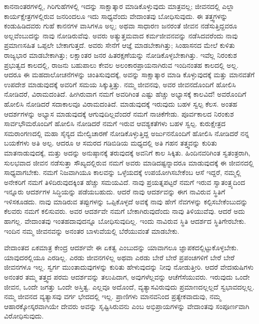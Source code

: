 ಕಾನನಾಂತರಗಳಲ್ಲಿ, ಗಿರಿಗುಹೆಗಳಲ್ಲಿ ಇದನ್ನು ಸಾಕ್ಷಾತ್ಕಾರ ಮಾಡಿಕೊಳ್ಳುವುದು ಮಾತ್ರವಲ್ಲ; ಜೀವನದಲ್ಲಿ ಎಲ್ಲಾ ಕಾರ್ಯಕ್ಷೇತ್ರಗಳಲ್ಲಿರುವ ಜನರಿಂದಲೂ ಇದು ಸಾಧ್ಯವೆಂದು ವೇದಾಂತವು ಬೋಧಿಸುವುದು. ಈ ತತ್ತ್ವಗಳನ್ನು ಕಂಡುಹಿಡಿದವರು ಗುಹೆ ಕಾನನಗಳ ವಾಸಿಗಳೂ ಅಲ್ಲ; ಅಥವಾ ಸಾಧಾರಣ ಜನರಂತೆ ಜೀವನ ನಡೆಸುತ್ತಿದ್ದವರೂ ಅಲ್ಲವೆಂಬುದನ್ನು ನಾವು ನೋಡಿರುವೆವು. ಅವರು ಅತ್ಯುತ್ತಮವಾದ ಕರ್ಮಜೀವನವನ್ನು ನಡೆಸಿದವರೆಂದು ನಾವು ಪ್ರಮಾಣಸಹಿತ ಒಪ್ಪಲೇ ಬೇಕಾಗುತ್ತದೆ. ಅವರು ಸೇನೆಗೆ ಆಜ್ಞೆ ಮಾಡಬೇಕಾಗಿತ್ತು; ಸಿಂಹಾಸನದ ಮೇಲೆ ಕುಳಿತು ರಾಜ್ಯಭಾರ ಮಾಡಬೇಕಾಗಿತ್ತು; ಲಕ್ಷಾಂತರ ಜನರ ಹಿತರಕ್ಷಣೆಯನ್ನು ನೋಡಿಕೊಳ್ಳಬೇಕಾಗಿತ್ತು. ಇವೆಲ್ಲ ನಿರಂಕುಶ ಪ್ರಭುತ್ವದ ಕಾಲದಲ್ಲಿ, ರಾಜನು ಬಹುಪಾಲು ಕೇವಲ ಅಲಂಕಾರಪ್ರಾಯನಾಗಿರುವ ಇಂದಿನಂತಹ ಕಾಲದಲ್ಲಿ ಅಲ್ಲ. ಆದರೂ ಈ ಮಹದಾಲೋಚನೆಗಳನ್ನು ಚಿಂತಿಸುವುದಕ್ಕೆ, ಅವನ್ನು ಸಾಕ್ಷಾತ್ಕಾರ ಮಾಡಿ ಕೊಳ್ಳುವುದಕ್ಕೆ ಮತ್ತು ಮಾನವತೆಗೆ ಉಪದೇಶ ಮಾಡುವುದಕ್ಕೆ ಅವರಿಗೆ ಸಮಯ ಸಿಕ್ಕುತ್ತಿತ್ತು. ನಮ್ಮ ಜೀವನವು, ಅವರ ಜೀವನದೊಂದಿಗೆ ಹೋಲಿಸಿ ನೋಡಿದರೆ, ವಿರಾಮದಂತಿದೆ. ಹೀಗಿರುವಾಗ ನಮಗೆ ಅವರಿಗಿಂತ ಎಷ್ಟು ಹೆಚ್ಚು ಅಭ್ಯಾಸಕ್ಕೆ ಕಾಲವಿದೆ! ಅವರೊಂದಿಗೆ ಹೋಲಿಸಿ ನೋಡಿದರೆ ಸದಾಕಾಲವೂ ವಿರಾಮದಂತಿದೆ. ಮಾಡುವುದಕ್ಕೆ ಇರುವುದು ಬಹಳ ಸ್ವಲ್ಪ ಕೆಲಸ. ಅಂತಹ ಆದರ್ಶಗಳನ್ನು ಅಭ್ಯಾಸ ಮಾಡುವುದಕ್ಕೆ ಆಗುವುದಿಲ್ಲವೆಂದರೆ ನಮಗೆ ನಾಚಿಕೆಗೇಡು. ಪೂರ್ವಕಾಲದ ನಿರಂಕುಶ ಸಾರ್ವಭೌಮರೊಂದಿಗೆ ಹೋಲಿಸಿ ನೋಡಿದರೆ ನಮಗೆ ಇರುವ ಆವಶ್ಯಕತೆಗಳು ಬಹಳ ಸ್ವಲ್ಪ. ಕುರುಕ್ಷೇತ್ರದ ಸಮರಾಂಗಣದಲ್ಲಿ ಮಹಾ ಸೈನ್ಯದ ಮೇಲ್ವಿಚಾರಣೆ ನೋಡಿಕೊಳ್ಳುತ್ತಿದ್ದ ಅರ್ಜುನನೊಂದಿಗೆ ಹೋಲಿಸಿ ನೋಡಿದರೆ ನನ್ನ ಬಯಕೆಗಳು ಅತಿ ಅಲ್ಪ. ಆದರೂ ಆ ಸಮರದ ಗಡಿಬಿಡಿಯ ಮಧ್ಯದಲ್ಲಿ ಅತಿ ಗಹನ ತತ್ತ್ವವನ್ನು ಕುರಿತು ಮಾತನಾಡುವುದಕ್ಕೆ, ಮತ್ತು ಅದನ್ನು ಅನುಷ್ಠಾನಕ್ಕೆ ತರುವುದಕ್ಕೆ ಅವನಿಗೆ ಕಾಲ ಸಿಕ್ಕಿತು. ಹಿಂದಿನವರಿಗಿಂತ ಸ್ವತಂತ್ರರಾಗಿ, ಸುಲಭವಾದ ಜೀವನ ನಡೆಸುತ್ತಾ ಸೌಖ್ಯದಲ್ಲಿರುವ ನಮಗೆ ಅವರು ಮಾಡಿದಷ್ಟನ್ನಾದರೂ ಮಾಡುವುದಕ್ಕೆ ಈ ಜೀವನದಲ್ಲಿ ಸಾಧ್ಯವಾಗಬೇಕು. ನಮಗೆ ನಿಜವಾಗಿಯೂ ಕಾಲವನ್ನು ಒಳ್ಳೆಯದಕ್ಕೆ ಉಪಯೋಗಿಸಬೇಕೆಂಬ ಆಸೆ ಇದ್ದರೆ, ನಮ್ಮಲ್ಲಿ ಅನೇಕರಿಗೆ ನಮಗೆ ತಿಳಿದಿರುವುದಕ್ಕಿಂತ ಹೆಚ್ಚು ಸಮಯವಿದೆ. ನಾವು ಪ್ರಯತ್ನಪಟ್ಟರೆ ನಮಗೆ ಇರುವ ಸ್ವಾತಂತ್ರ್ಯದಿಂದ ಇನ್ನೂರು ಆದರ್ಶಗಳ ಸಿದ್ಧಿಯನ್ನು ಪಡೆಯಬಹುದು. ಆದರೆ ನಾವು ಆದರ್ಶವನ್ನು ಈಗ ನಾವಿರುವ ಸ್ಥಿತಿಗೆ ಇಳಿಸಕೂಡದು. ನಾವು ಮಾಡಿರುವ ತಪ್ಪುಗಳನ್ನು ಒಪ್ಪಿಕೊಳ್ಳದೆ ಅವಕ್ಕೆ ನಾವು ಹೇಗೆ ನೆವಗಳನ್ನು ಕಲ್ಪಿಸಬೇಕೆಂಬುದನ್ನು ಕೆಲವರು ನಮಗೆ ಕಲಿಸುವರು. ಅವರ ಆದರ್ಶವೇ ನಮಗೆ ಬೇಕಾಗಿರುವುದೆಂದು ನಾವು ತಿಳಿಯುವೆವು. ಆದರೆ ಅದು ಹಾಗಲ್ಲ. ವೇದಾಂತವು ಇಂತಹದಾವುದನ್ನೂ ಬೋಧಿಸುವುದಿಲ್ಲ. ಇಂದು ನಾವಿರುವ ಸ್ಥಿತಿ ಆದರ್ಶದ ಸ್ಥಿತಿಗೇರಬೇಕು. ಇಂದಿನ ನಮ್ಮ ಜೀವನವನ್ನು ಅನಂತರ ಬಾಳುವೆಯಲ್ಲಿ ಬೆರೆಯುವಂತೆ ಮಾಡಬೇಕು. 

\vskip 3pt

ವೇದಾಂತದ ಏಕಮಾತ್ರ ಕೇಂದ್ರ ಆದರ್ಶವೇ ಈ ಏಕತ್ವ ಎಂಬುದನ್ನು ಯಾವಾಗಲೂ ಜ್ಞಾಪಕದಲ್ಲಿಟ್ಟುಕೊಳ್ಳಬೇಕು. ಯಾವುದರಲ್ಲಿಯೂ ಎರಡಿಲ್ಲ. ಎರಡು ಜೀವನಗಳಿಲ್ಲ ಅಥವಾ ಎರಡು ಬೇರೆ ಬೇರೆ ಪ್ರಪಂಚಗಳಿಗೆ ಬೇರೆ ಬೇರೆ ಜೀವನಗಳೂ ಇಲ್ಲ. ಸ್ವರ್ಗ ಮುಂತಾದುವುಗಳನ್ನು ಕುರಿತು ಹೇಳುವುದನ್ನು ನೀವು ನೋಡುತ್ತೀರಿ. ಆದರೆ ವೇದಋಷಿಗಳು ಅನಂತರ ತಮ್ಮ ತತ್ತ್ವದ ಪರಮ ಆದರ್ಶವನ್ನು ತಲುಪಿದಾಗ, ಅವುಗಳೆಲ್ಲವನ್ನು ಆಚೆಗೆಸೆಯುವರು. ಇರುವುದು ಒಂದೇ ಜೀವನ, ಒಂದೇ ಜಗತ್ತು ಒಂದೇ ಅಸ್ತಿತ್ವ. ಎಲ್ಲವೂ ಅದೊಂದೆ, ವ್ಯತ್ಯಾಸವಿರುವುದು ಪ್ರಮಾಣದಲ್ಲಲ್ಲದೆ ಸ್ವಭಾವದಲ್ಲಲ್ಲ. ನಮ್ಮ ಜೀವನದ ವ್ಯತ್ಯಾಸವು ವರ್ಗ ಭೇದದಲ್ಲಿ ಇಲ್ಲ. ಪ್ರಾಣಿಗಳು ಮಾನವನಿಂದ ಪ್ರತ್ಯೇಕವಾದುವು, ನಮ್ಮ ಆಹಾರಕ್ಕೋಸ್ಕರವಾಗಿಯೇ ದೇವರು ಅವನ್ನು ಸೃಷ್ಟಿಸಿರುವನು ಎಂಬ ಅಭಿಪ್ರಾಯಗಳನ್ನು ವೇದಾಂತವು ಸಂಪೂರ್ಣವಾಗಿ ವಿರೋಧಿಸುವುದು. 

